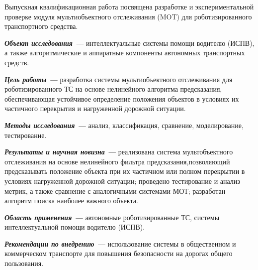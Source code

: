 \begin{essaywithapp}

	Выпускная квалификационная работа посвящена разработке и экспериментальной проверке модуля мультиобъектного отслеживания (MOT) для роботизированного транспортного средства.

	\textbf{\textit{Объект исследования ---}} интеллектуальные системы помощи водителю (ИСПВ), а также алгоритмические и аппаратные компоненты автономных транспортных средств.

	\textbf{\textit{Цель работы ---}} разработка системы мультиобъектного отслеживания для роботизированного ТС на основе нелинейного алгоритма предсказания, обеспечивающая устойчивое определение положения объектов в условиях их частичного перекрытия и нагруженной дорожной ситуации.

	\textbf{\textit{Методы исследования ---}} анализ, классификация, сравнение, моделирование, тестирование.

	\textbf{\textit{Результаты и научная новизна ---}} реализована система мультобъектного отслеживания на основе нелинейного фильтра предсказания,позволяющий предсказывать положение объекта при их частичном или полном перекрытии в условиях нагруженной дорожной ситуации; проведено тестирование и анализ метрик, а также сравнение с аналогичными системами МОТ; разработан алгоритм поиска наиболее важного объекта.

	\textbf{\textit{Область применения ---}} автономные роботизированные ТС, системы интеллектуальной помощи водителю (ИСПВ).

	\textbf{\textit{Рекомендации по внедрению ---}} использование системы в общественном и коммерческом транспорте для повышения безопасности на дорогах общего пользования. 

\end{essaywithapp}